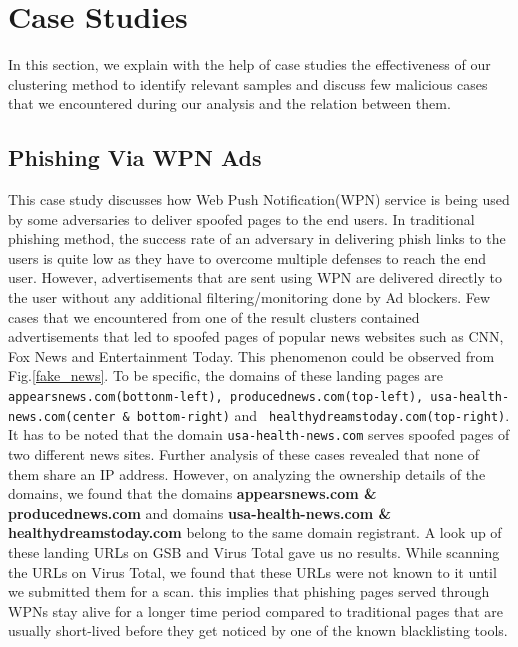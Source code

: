\section{Case Studies}
In this section, we explain with the help of case studies the effectiveness of our clustering method to identify relevant samples and discuss few malicious cases that we encountered during our analysis and the relation between them.

\subsection{Phishing Via WPN Ads}
This case study discusses how Web Push Notification(WPN) service is being used by some adversaries to deliver spoofed pages to the end users. In traditional phishing method, the success rate of an adversary in delivering phish links to the users is quite low as they have to overcome multiple defenses to reach the end user. However, advertisements that are sent using WPN are delivered directly to the user without any additional filtering/monitoring done by Ad blockers. Few cases that we encountered from one of the result clusters contained advertisements that led to spoofed pages of popular news websites such as CNN, Fox News and Entertainment Today. This phenomenon could be observed from Fig.\ref{fake_news}. To be specific, the domains of these landing pages are \texttt{appearsnews.com(bottonm-left),  producednews.com(top-left), usa-health-news.com(center \& bottom-right)} and \texttt{ healthydreamstoday.com(top-right)}. It has to be noted that the domain \texttt{usa-health-news.com} serves spoofed pages of two different news sites. Further analysis of these cases revealed that none of them share an IP address. However, on analyzing the ownership details of the domains, we found that the domains \textbf{appearsnews.com \& producednews.com} and domains \textbf{usa-health-news.com \& healthydreamstoday.com} belong to the same domain registrant. A look up of these landing URLs on GSB and Virus Total gave us no results. While scanning the URLs on Virus Total, we found that these URLs were not known to it until we submitted them for a scan. this implies that phishing pages served through WPNs stay alive for a longer time period compared to traditional pages that are usually short-lived before they get noticed by one of the known blacklisting tools. 

